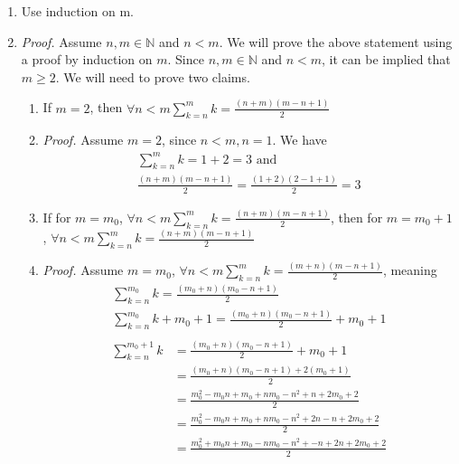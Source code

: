 \documentclass{article}
\begin{document}
\begin{enumerate}
\begin{enumerate}
            \item Use induction on m.
            \item[] \emph{Proof.} Assume $n, m \in \mathbb{N}$ and $n < m$.
                We will prove the above statement using a proof by induction on $m$.
                Since $n, m \in \mathbb{N}$ and $n < m$, it can be implied that $m \ge 2$. We will need to prove two claims.
                \begin{enumerate}
                    \item If $m = 2$, then $\forall n < m \sum\limits_{k=n}^m k = \frac{(n+m)(m-n+1)}{2}$
                    \item[] \emph{Proof.} Assume $m = 2$, since $n < m, n = 1$. We have
                        \begin{gather*}
                            \sum\limits_{k=n}^m k = 1 + 2 = 3 \text{ and } \\
                            \frac{(n + m)(m-n+1)}{2} = \frac{(1 + 2)(2 - 1 + 1)}{2} = 3
                        \end{gather*}
                    \item If for $m = m_0$, $\forall n < m \sum\limits_{k=n}^m k = \frac{(n+m)(m-n+1)}{2}$, then for $m = m_0 + 1$, $\forall n < m \sum\limits_{k=n}^m k = \frac{(n+m)(m-n+1)}{2}$
                    \item[] \emph{Proof.} Assume $m = m_0$, $\forall n < m \sum\limits_{k=n}^m k = \frac{(m+n)(m-n+1)}{2}$, meaning
                        \begin{gather*}
                            \sum\limits_{k=n}^{m_0} k = \frac{(m_0+n)(m_0 - n + 1)}{2}\\
                            \sum\limits_{k=n}^{m_0} k + m_0 + 1 = \frac{(m_0+n)(m_0-n+1)}{2} + m_0 + 1\\
                        \end{gather*}
                        \begin{align*}
                            \sum\limits_{k=n}^{m_0 + 1} k &= \frac{(m_0+n)(m_0-n+1)}{2} + m_0 + 1\\
                            & = \frac{(m_0 + n)(m_0 - n + 1) + 2(m_0 + 1)}{2}\\
                            & = \frac{m_0^2 - m_0n + m_0 + nm_0 - n^2 + n + 2m_0 + 2}{2}\\
                            & = \frac{m_0^2 - m_0n + m_0 + nm_0 - n^2 + 2n - n + 2m_0 + 2}{2}\\
                            & = \frac{m_0^2 + m_0n + m_0 - nm_0 - n^2 + - n + 2n + 2m_0 + 2}{2}\\

\end{align*}
\end{enumerate}
\end{enumerate}
\end{enumerate}
\end{document}
